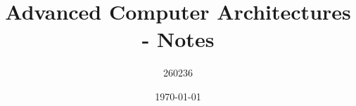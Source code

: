 \author{260236}
\title{Advanced Computer Architectures - Notes}
\date{\printdayoff\today}
\maketitle